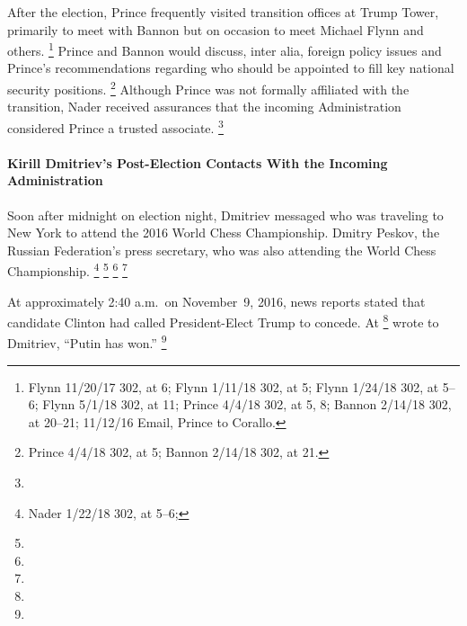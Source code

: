 After the election, Prince frequently visited transition offices at Trump Tower, primarily to meet with Bannon but on occasion to meet Michael Flynn and others.%
\footnote{Flynn 11/20/17 302, at 6;
Flynn 1/11/18 302, at 5;
Flynn 1/24/18 302, at 5--6;
Flynn 5/1/18 302, at 11;
Prince 4/4/18 302, at 5, 8;
Bannon 2/14/18 302, at 20--21;
11/12/16 Email, Prince to Corallo.}
Prince and Bannon would discuss, inter alia, foreign policy issues and Prince's recommendations regarding who should be appointed to fill key national security positions.%
\footnote{Prince 4/4/18 302, at 5;
Bannon 2/14/18 302, at 21.}
Although Prince was not formally affiliated with the transition, Nader
received assurances
that the incoming Administration considered Prince a trusted associate.%
\footnote{}

\paragraph{Kirill Dmitriev's Post-Election Contacts With the Incoming Administration}

Soon after midnight on election night, Dmitriev messaged
who was traveling to New York to attend the 2016 World Chess Championship.
Dmitry Peskov, the Russian Federation's press secretary, who was also attending the World Chess Championship.%
\footnote{ Nader 1/22/18 302, at 5--6; }
\footnote{}
\footnote{}
\footnote{}

At approximately 2:40 a.m.\ on November~9, 2016, news reports stated that candidate Clinton had called President-Elect Trump to concede.
At
\footnote{}
wrote to Dmitriev, ``Putin has won.''%
\footnote{}

